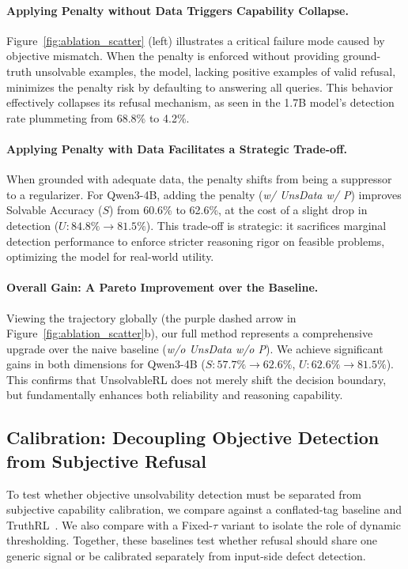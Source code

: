 \paragraph{Applying Penalty without Data Triggers Capability Collapse.}
Figure~\ref{fig:ablation_scatter} (left) illustrates a critical failure mode caused by objective mismatch. When the penalty is enforced without providing ground-truth unsolvable examples, the model, lacking positive examples of valid refusal, minimizes the penalty risk by defaulting to answering all queries. This behavior effectively collapses its refusal mechanism, as seen in the 1.7B model's detection rate plummeting from 68.8\% to 4.2\%.

\paragraph{Applying Penalty with Data Facilitates a Strategic Trade-off.}
When grounded with adequate data, the penalty shifts from being a suppressor to a regularizer. For Qwen3-4B, adding the penalty (\textit{w/ UnsData w/ P}) improves Solvable Accuracy ($S$) from 60.6\% to 62.6\%, at the cost of a slight drop in detection ($U: 84.8\% \to 81.5\%$). This trade-off is strategic: it sacrifices marginal detection performance to enforce stricter reasoning rigor on feasible problems, optimizing the model for real-world utility.

\paragraph{Overall Gain: A Pareto Improvement over the Baseline.}
Viewing the trajectory globally (the purple dashed arrow in Figure~\ref{fig:ablation_scatter}b), our full method represents a comprehensive upgrade over the naive baseline (\textit{w/o UnsData w/o P}). We achieve significant gains in both dimensions for Qwen3-4B ($S: 57.7\% \to 62.6\%$, $U: 62.6\% \to 81.5\%$). This confirms that UnsolvableRL does not merely shift the decision boundary, but fundamentally enhances both reliability and reasoning capability.


\subsection{Calibration: Decoupling Objective Detection from Subjective Refusal}

To test whether objective unsolvability detection must be separated from subjective capability calibration, we compare against a conflated-tag baseline and TruthRL~\citep{wei2025truthrl}. We also compare with a Fixed-$\tau$ variant to isolate the role of dynamic thresholding. Together, these baselines test whether refusal should share one generic signal or be calibrated separately from input-side defect detection.


